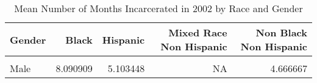 \begin{table}[H]

\caption{\label{tab:summarystats}Mean Number of Months Incarcerated in 2002 by Race and Gender}
\centering
\begin{tabular}[t]{lrrrr}
\toprule
Gender & Black & Hispanic & Mixed Race Non Hispanic & Non Black Non Hispanic\\
\midrule
\cellcolor{gray!6}{Female} & \cellcolor{gray!6}{2.666667} & \cellcolor{gray!6}{4.500000} & \cellcolor{gray!6}{6} & \cellcolor{gray!6}{3.230769}\\
Male & 8.090909 & 5.103448 & NA & 4.666667\\
\bottomrule
\end{tabular}
\end{table}
